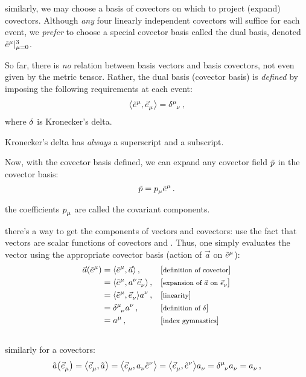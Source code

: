  similarly, we may choose a basis of covectors on which to project (expand) covectors. Although \emph{any} four linearly independent covectors will suffice for each event, we \emph{prefer} to choose a special covector basis called the dual basis, denoted $\bset{\tbcov\mu}{\mu = 0}{3}$.

 So far, there is \emph{no} relation between basis vectors and basis covectors, not even given by the metric tensor. Rather, the dual basis (covector basis) is \emph{defined} by imposing the following requirements at each event:
%
\begin{equation}\label{eq:relationbasisvecbasiscovec}
  \sprod{\tbcov\mu}{\tbvec\mu} = \tkron\mu\nu\,,
\end{equation}
%
where $\delta$ is Kronecker's delta.

 Kronecker's delta has \emph{always} a superscript and a subscript.

 Now, with the covector basis defined, we can expand any covector field $\tilde{p}$ in the covector basis:
%
\begin{equation}\label{eq:vectorprojectiononbasiscovecs}
  \cov p = \tcov p\mu\tbcov\mu\,.
\end{equation}

 the coefficients $\tcov p\mu$ are called the covariant components.

 there's a  way to get the components of vectors and covectors: use the fact that vectors are scalar functions of covectors and \vicvers. Thus, one simply evaluates the vector using the appropriate covector basis (action of $\vec a$ on $\tbcov\mu$):
%
\begin{align}\label{eq:veccomponentsusingcovecbasis}
  \vec a\vat{\tbcov\mu} &= \sprod{\tbcov\mu}{\vec a}               \,,&&\eqtxt{definition of covector}\\\nonumber
                        &= \sprod{\tbcov\mu}{\tvec a\nu\tbvec\nu}  \,,&&\eqtxt{expansion of $\vec a$ on $\tbvec\nu$}\\\nonumber
                        &= \sprod{\tbcov\mu}{\tbvec\nu}\tvec a\nu  \,,&&\eqtxt{linearity}\\\nonumber
                        &= \tkron\mu\nu\tvec a\nu                  \,,&&\eqtxt{definition of $\kron$}\\\nonumber
                        &= \tvec a\mu                              \,,&&\eqtxt{index gymnastics}\\\nonumber
\end{align}
%
similarly for a covectors:
%
\begin{equation}\label{eq:covcomponentsusingvecbasis}
  \cov a\vat{\tbvec\mu} = \sprod{\tbvec\mu}{\cov a}
                        = \sprod{\tbvec\mu}{\tcov a\nu\tbcov\nu}
                        = \sprod{\tbvec\mu}{\tbcov\nu}\tcov a\nu
                        = \tkron\mu\nu\tcov a\nu
                        = \tcov a\nu\,,
\end{equation}

